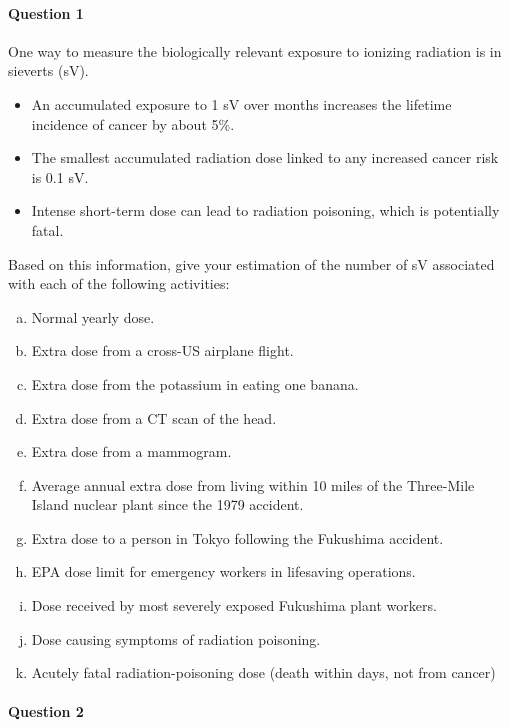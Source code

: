 \begin{multicols}{2}
\paragraph{Question 1}

One way to measure the biologically relevant exposure to ionizing
radiation is in sieverts (sV). 

\begin{itemize}
\item An accumulated exposure to 1 sV over months increases the lifetime incidence of cancer by
  about 5\%.
\item The smallest accumulated radiation dose linked to any increased cancer risk is
  0.1 sV.
\item Intense short-term dose can lead to radiation poisoning, which
  is potentially fatal.
\end{itemize}

Based on this information, give your estimation of the number of sV
associated with each of the following activities:

\begin{enumerate}[(a)]
\item Normal yearly dose.
\item Extra dose from a cross-US airplane flight.
\item Extra dose from the potassium in eating one banana.
\item Extra dose from a CT scan of the head.
\item Extra dose from a mammogram.
\item Average annual extra dose from living within 10 miles of the Three-Mile Island
  nuclear plant since the 1979 accident. 
\item Extra dose to a person in Tokyo following the Fukushima accident.
\item EPA dose limit for emergency workers in lifesaving operations.
\item Dose received by most severely exposed Fukushima plant workers.
\item Dose causing symptoms of radiation poisoning.
\item Acutely fatal radiation-poisoning dose (death within days, not from cancer)
\end{enumerate}

\paragraph{Question 2}


\end{multicols}
